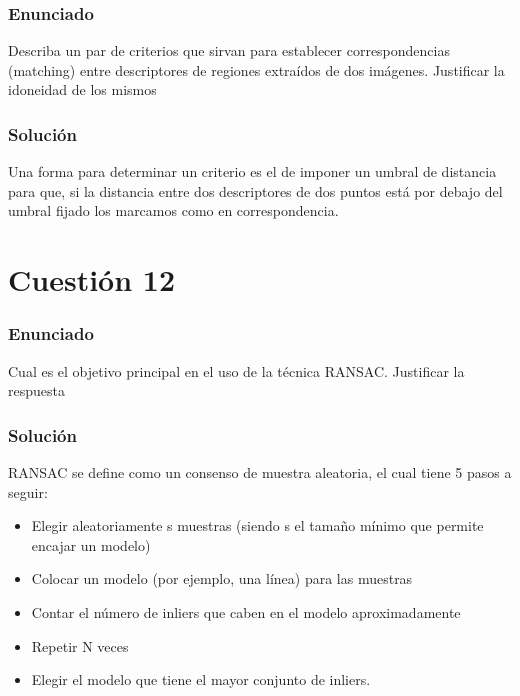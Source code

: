 \subsubsection{Enunciado}

Describa un par de criterios que sirvan para establecer correspondencias (matching) entre descriptores de regiones extraídos de dos imágenes. Justificar la idoneidad de los mismos 

\subsubsection{Solución}

Una forma para determinar un criterio es el de imponer un umbral de distancia para que, si la distancia entre dos descriptores de dos puntos está por debajo del umbral fijado los marcamos como en correspondencia.


\section{Cuestión 12}

\subsubsection{Enunciado}

Cual es el objetivo principal en el uso de la técnica RANSAC. Justificar la respuesta

\subsubsection{Solución}

RANSAC se define como un consenso de muestra aleatoria, el cual tiene 5 pasos a seguir:

\begin{itemize}
	\item Elegir aleatoriamente s muestras (siendo s el tamaño mínimo que permite encajar un modelo)
	\item Colocar un modelo (por ejemplo, una línea) para las muestras
	\item Contar el número de inliers que caben en el modelo aproximadamente
	\item Repetir N veces
	\item Elegir el modelo que tiene el mayor conjunto de inliers.
\end{itemize}

